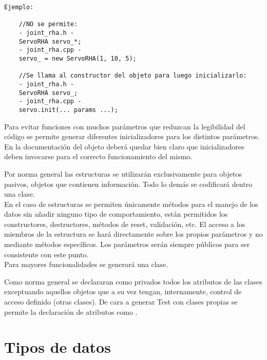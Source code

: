     \lstset{language=C, breaklines=true, basicstyle=\footnotesize}
    \begin{lstlisting}[frame=single]
Ejemplo: 
    
	//NO se permite:
    - joint_rha.h -
    ServoRHA servo_*;
    - joint_rha.cpp -
    servo_ = new ServoRHA(1, 10, 5);
    
    //Se llama al constructor del objeto para luego inicializarlo:
    - joint_rha.h -
    ServoRHA servo_;
    - joint_rha.cpp -
    servo.init(... params ...);

    \end{lstlisting}

Para evitar funciones con muchos parámetros que reduzcan la legibilidad del código se permite generar diferentes inicializadores para los distintos parámetros. En la documentación del objeto deberá quedar bien claro que inicializadores deben invocarse para el correcto funcionamiento del mismo.


Por norma general las estructuras se utilizarán exclusivamente para objetos pasivos, objetos que contienen información. Todo lo demás se codificará dentro una clase.
\\ 

En el caso de estructuras se permiten únicamente métodos para el manejo de los datos sin añadir ninguno tipo de comportamiento, están permitidos los constructores, destructores, métodos de reset, validación, etc. El acceso a los miembros de la estructura se hará directamente sobre los propios parámetros y no mediante métodos específicos. Los parámetros serán siempre públicos para ser consistente con este punto.
\\ 

Para mayores funcionalidades se generará una clase.


Como norma general se declararan como privados todos los atributos de las clases exceptuando aquellos objetos que a su vez tengan, internamente, control de acceso definido (otras clases). De cara a generar Test con clases propias se permite la declaración de atributos como .

\section{Tipos de datos}\label{sec:codificacionSW:datos}

